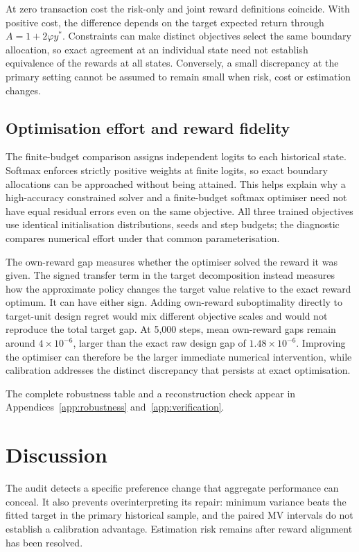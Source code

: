 \documentclass[sigconf,anonymous,review]{acmart}
\begin{document}
At zero transaction cost the risk-only and joint reward definitions coincide. With positive cost, the difference depends on the target expected return through $A=1+2\varphi y^*$. Constraints can make distinct objectives select the same boundary allocation, so exact agreement at an individual state need not establish equivalence of the rewards at all states. Conversely, a small discrepancy at the primary setting cannot be assumed to remain small when risk, cost or estimation changes.

\subsection{Optimisation effort and reward fidelity}
The finite-budget comparison assigns independent logits to each historical state. Softmax enforces strictly positive weights at finite logits, so exact boundary allocations can be approached without being attained. This helps explain why a high-accuracy constrained solver and a finite-budget softmax optimiser need not have equal residual errors even on the same objective. All three trained objectives use identical initialisation distributions, seeds and step budgets; the diagnostic compares numerical effort under that common parameterisation.

The own-reward gap measures whether the optimiser solved the reward it was given. The signed transfer term in the target decomposition instead measures how the approximate policy changes the target value relative to the exact reward optimum. It can have either sign. Adding own-reward suboptimality directly to target-unit design regret would mix different objective scales and would not reproduce the total target gap. At 5,000 steps, mean own-reward gaps remain around $4\times10^{-6}$, larger than the exact raw design gap of $1.48\times10^{-6}$. Improving the optimiser can therefore be the larger immediate numerical intervention, while calibration addresses the distinct discrepancy that persists at exact optimisation.

The complete robustness table and a reconstruction check appear in Appendices~\ref{app:robustness} and~\ref{app:verification}.

\section{Discussion}
The audit detects a specific preference change that aggregate performance can conceal. It also prevents overinterpreting its repair: minimum variance beats the fitted target in the primary historical sample, and the paired MV intervals do not establish a calibration advantage. Estimation risk remains after reward alignment has been resolved.
\end{document}
